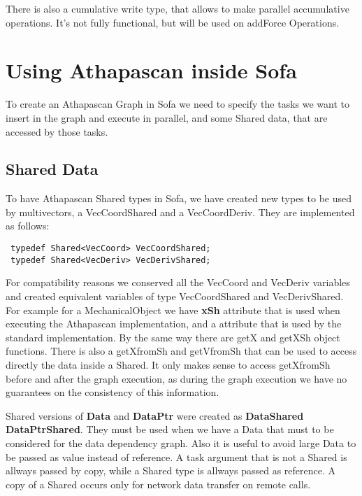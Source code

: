 There is also a cumulative write type, that allows to make parallel accumulative operations. It's not fully functional, but will be used on addForce Operations.

\section{Using Athapascan inside Sofa}
To create an Athapascan Graph in Sofa we need to specify the tasks we want to insert in the graph and execute in  parallel, and some Shared data, that are accessed by those tasks. 
\subsection{Shared Data}
To have Athapascan Shared types in Sofa, we have created new types to be used by multivectors, a VecCoordShared and a VecCoordDeriv. They are implemented as follows:

\begin{verbatim}
 typedef Shared<VecCoord> VecCoordShared;
 typedef Shared<VecDeriv> VecDerivShared;
\end{verbatim}

For compatibility reasons we conserved all the VecCoord and VecDeriv variables and created equivalent variables of type VecCoordShared and VecDerivShared. For example for a MechanicalObject we have \textbf{xSh} attribute that is used when executing the Athapascan implementation, and a  attribute that is used by the standard implementation. By the same way there are getX and getXSh object functions. There is also a getXfromSh and getVfromSh that can be used to access directly the data inside a Shared.  It only makes sense to access getXfromSh before and after the graph execution, as during the graph execution we have no guarantees on the consistency of this information.	

Shared versions of \textbf{Data} and \textbf{DataPtr} were created as \textbf{DataShared} \textbf{DataPtrShared}. They must be used when we have a Data that must  to be considered for the  data dependency  graph. Also it is useful to avoid large Data to be passed as value instead of reference. A task argument that is not a Shared is allways passed by copy, while a Shared type is allways passed as reference. A copy  of a Shared occurs only for network data transfer on remote calls.
